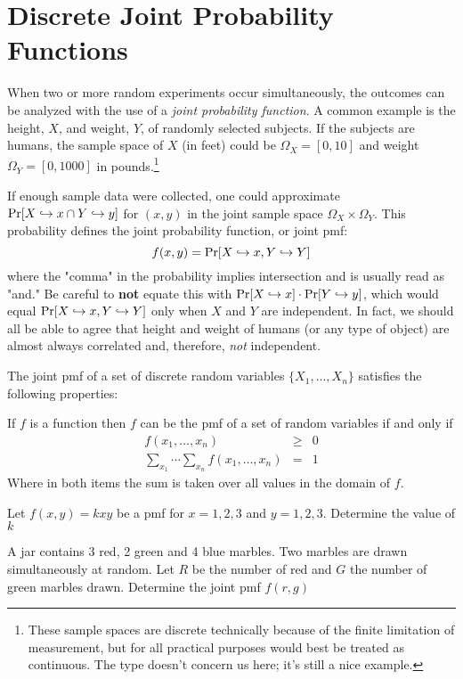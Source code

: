\documentclass[../main.tex]{subfiles}
\begin{document}
\section{Discrete Joint Probability Functions}

When two or more random experiments occur simultaneously, the 
outcomes can be analyzed with the use of a \textit{joint probability
function}. A common example is the height, $X$,  and weight, $Y$, of randomly selected subjects. If the subjects are humans, the sample space of $X$ (in feet) could 
be $\Omega_X = [0,10]$ and weight $\Omega_Y = [0,1000]$ in pounds.\footnote{These
sample spaces are discrete technically because of the finite limitation
of measurement, but for all practical purposes would best be treated as
continuous. The type doesn't concern us here; it's still a nice example.}

If enough sample data were collected, one could approximate $\mathrm{Pr}[X \hookrightarrow x \cap Y \hookrightarrow y]$ for $(x,y)$ in the joint sample space $\Omega_X \times
\Omega_Y$. This probability defines the joint probability function, or joint pmf:
$$f(x,y) = \mathrm{Pr}[X \hookrightarrow x, Y \hookrightarrow Y]$$
where the "comma" in the probability implies intersection and is usually read as "and." Be careful to \textbf{not} equate this with $\mathrm{Pr}[X \hookrightarrow x]\cdot\mathrm{Pr}[Y \hookrightarrow y]$, which would equal $\mathrm{Pr}[X \hookrightarrow x, Y \hookrightarrow Y]$
only when $X$ and $Y$ are independent. In fact, we should all be able to agree that height and weight of humans (or any type of object) are
almost always correlated and, therefore, \textit{not} independent.

The joint pmf of a set of discrete random variables $\{X_1, \ldots, X_n\}$
satisfies the following properties:
\begin{theorem} If $f$ is a function then $f$ can be the pmf of a set of random variables if and only if
\begin{eqnarray}
     f(x_1,\ldots,x_n) &\geq& 0 \\
    \sum_{x_1}\cdots\sum_{x_n}f(x_1,\ldots,x_n) &=& 1
\end{eqnarray}
Where in both items the sum is taken over all values in the domain of $f$.
\end{theorem}

\begin{example}
Let $f(x,y) = kxy$ be a pmf for $x=1,2,3$ and $y=1,2,3$. Determine the value of $k$
\end{example}

\begin{example}
A jar contains 3 red, 2 green and 4 blue marbles. Two marbles are drawn simultaneously at random. Let $R$ be the number of red and $G$ the number
of green marbles drawn. Determine the joint pmf $f(r,g)$
\label{ex:jar}
\end{example}
\end{document}
